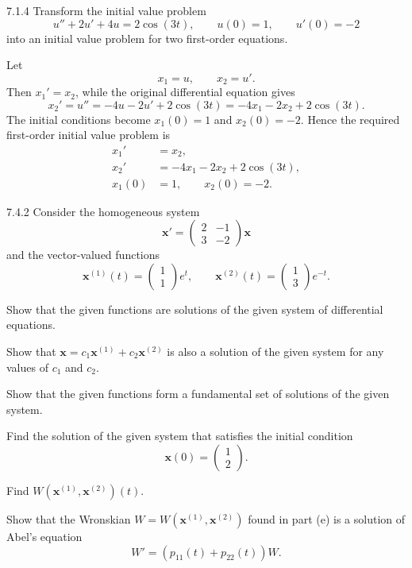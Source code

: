 \documentclass[11pt,oneside]{article}
\begin{document}
\begin{problem}{7.1.4}
Transform the initial value problem
\[
    u''+2u'+4u=2\cos(3t),
    \qquad
    u(0)=1,
    \qquad
    u'(0)=-2
\]
into an initial value problem for two first-order equations.
\end{problem}

\begin{solution}
Let
\[
    x_1=u,
    \qquad
    x_2=u'.
\]
Then $x_1'=x_2$, while the original differential equation gives
\[
    x_2'=u''=-4u-2u'+2\cos(3t)
    =-4x_1-2x_2+2\cos(3t).
\]
The initial conditions become $x_1(0)=1$ and $x_2(0)=-2$. Hence the required first-order initial value problem is
\[
    \boxed{
    \begin{aligned}
        x_1'&=x_2,\\
        x_2'&=-4x_1-2x_2+2\cos(3t),\\
        x_1(0)&=1,
        \qquad
        x_2(0)=-2.
    \end{aligned}}
\]
\end{solution}

\begin{problem}{7.4.2}
Consider the homogeneous system
\[
    \mathbf{x}'
    =\begin{pmatrix}
        2&-1\\
        3&-2
    \end{pmatrix}\mathbf{x}
\]
and the vector-valued functions
\[
    \mathbf{x}^{(1)}(t)
    =\begin{pmatrix}1\\1\end{pmatrix}e^t,
    \qquad
    \mathbf{x}^{(2)}(t)
    =\begin{pmatrix}1\\3\end{pmatrix}e^{-t}.
\]
\begin{problemsubparts}
    \item Show that the given functions are solutions of the given system of differential equations.
    \item Show that $\mathbf{x}=c_1\mathbf{x}^{(1)}+c_2\mathbf{x}^{(2)}$ is also a solution of the given system for any values of $c_1$ and $c_2$.
    \item Show that the given functions form a fundamental set of solutions of the given system.
    \item Find the solution of the given system that satisfies the initial condition
    \[
        \mathbf{x}(0)=\begin{pmatrix}1\\2\end{pmatrix}.
    \]
    \item Find $W(\mathbf{x}^{(1)},\mathbf{x}^{(2)})(t)$.
    \item Show that the Wronskian $W=W(\mathbf{x}^{(1)},\mathbf{x}^{(2)})$ found in part (e) is a solution of Abel's equation
    \[
        W'=(p_{11}(t)+p_{22}(t))W.
    \]
\end{problemsubparts}
\end{problem}
\end{document}
